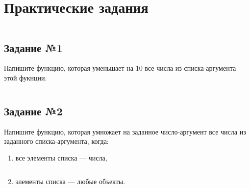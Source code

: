 \chapter{Практические задания}

\vspace{4mm}
\hfill
\begin{minipage}{0.92\linewidth}
\begin{lstlisting}
\end{lstlisting}
\end{minipage}

\section{Задание №1}

Напишите функцию, которая уменьшает на 10 все числа из списка-аргумента этой
фукнции.

\vspace{4mm}
\hfill
\begin{minipage}{0.92\linewidth}
\begin{lstlisting}
\end{lstlisting}
\end{minipage}

\section{Задание №2}

Напишите функцию, которая умножает на заданное число-аргумент все числа
из заданного списка-аргумента, когда:

\begin{enumerate}
    \item все элементы списка --- числа,

\vspace{4mm}
\begin{minipage}{0.92\linewidth}
\begin{lstlisting}
\end{lstlisting}
\end{minipage}

    \item элементы списка --- любые объекты.

\vspace{4mm}
\begin{minipage}{0.92\linewidth}
\begin{lstlisting}
\end{lstlisting}
\end{minipage}
\end{enumerate}

